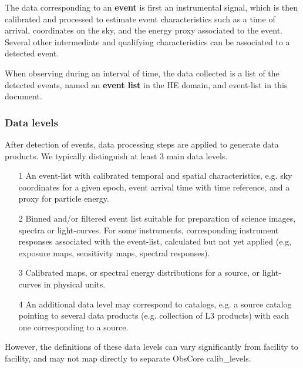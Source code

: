 \documentclass[11pt,a4paper]{ivoa}
\begin{document}
The data corresponding to an \textbf{event} is first an instrumental signal, which is then calibrated and processed to estimate event characteristics such as a time of arrival, coordinates on the sky, and the energy proxy associated to the event. Several other intermediate and qualifying characteristics can be associated to a detected event.

When observing during an interval of time, the data collected is a list of the detected events, named an \textbf{event list} in the HE domain, and event-list in this document.




\subsubsection{Data levels}\label{sec:datalevels}

After detection of events, data processing steps are applied to generate data products. We typically distinguish at least 3 main data levels.

\begin{itemize}
    \item[1] An event-list with calibrated temporal and spatial characteristics, e.g. sky coordinates for a given epoch, event arrival time with time reference, and a proxy for particle energy.
    \item[2] Binned and/or filtered event list suitable for preparation of science images, spectra or light-curves.  For some instruments, corresponding instrument responses associated with the event-list, calculated but not yet applied (e.g, exposure maps, sensitivity maps, spectral responses).
    \item[3] Calibrated maps, or spectral energy distributions for a source, or light-curves in physical units.
    \item[4] An additional data level may correspond to catalogs, e.g. a source catalog pointing to several data products (e.g. collection of L3 products) with each one corresponding to a source.
\end{itemize}

However, the definitions of these data levels can vary significantly from facility to facility, and may not map directly to separate ObsCore calib\_levels.
\end{document}
